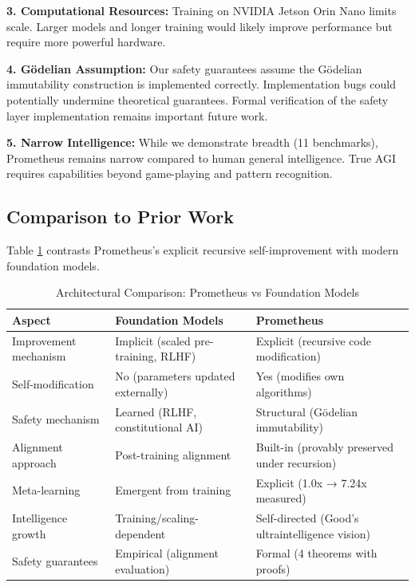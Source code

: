 \documentclass[11pt,letterpaper]{article}
\begin{document}
\textbf{3. Computational Resources:} Training on NVIDIA Jetson Orin Nano limits scale. Larger models and longer training would likely improve performance but require more powerful hardware.

\textbf{4. Gödelian Assumption:} Our safety guarantees assume the Gödelian immutability construction is implemented correctly. Implementation bugs could potentially undermine theoretical guarantees. Formal verification of the safety layer implementation remains important future work.

\textbf{5. Narrow Intelligence:} While we demonstrate breadth (11 benchmarks), Prometheus remains narrow compared to human general intelligence. True AGI requires capabilities beyond game-playing and pattern recognition.

\subsection{Comparison to Prior Work}

Table \ref{tab:comparison} contrasts Prometheus's explicit recursive self-improvement with modern foundation models.

\begin{table}[h]
\centering
\caption{Architectural Comparison: Prometheus vs Foundation Models}
\label{tab:comparison}
\begin{tabular}{@{}p{3.5cm}p{4.5cm}p{4.5cm}@{}}
\toprule
\textbf{Aspect} & \textbf{Foundation Models} & \textbf{Prometheus} \\ \midrule
Improvement mechanism & Implicit (scaled pre-training, RLHF) & Explicit (recursive code modification) \\
Self-modification & No (parameters updated externally) & Yes (modifies own algorithms) \\
Safety mechanism & Learned (RLHF, constitutional AI) & Structural (Gödelian immutability) \\
Alignment approach & Post-training alignment & Built-in (provably preserved under recursion) \\
Meta-learning & Emergent from training & Explicit (1.0x → 7.24x measured) \\
Intelligence growth & Training/scaling-dependent & Self-directed (Good's ultraintelligence vision) \\
Safety guarantees & Empirical (alignment evaluation) & Formal (4 theorems with proofs) \\ \bottomrule
\end{tabular}
\end{table}
\end{document}
